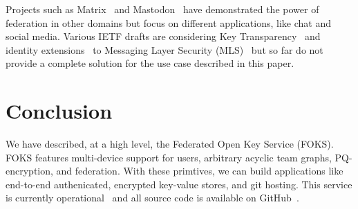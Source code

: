 \documentclass[11pt]{article}
\begin{document}
Projects such as Matrix~\cite{matrix} and Mastodon~\cite{mastadon} have
demonstrated the power of federation in other domains but focus on different
applications, like chat and social media. Various IETF drafts are considering
Key Transparency~\cite{ietf-keytrans-architecture-03} and identity
extensions~\cite{barnes-mimi-identity-arch-02} to Messaging Layer Security
(MLS)~\cite{rfc9420} but so far do not provide a complete solution for the use
case described in this paper.

\section{Conclusion}

We have described, at a high level, the Federated Open Key Service (FOKS).
FOKS features multi-device support for users, arbitrary acyclic team graphs,
PQ-encryption, and federation. With these primtives, we can build applications
like end-to-end authenicated, encrypted key-value stores, and git hosting.
This service is currently operational~\cite{foks-app} and all 
source code is available on GitHub~\cite{foks-github}.



\end{document}
